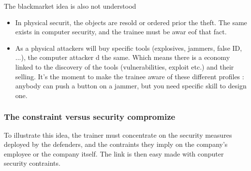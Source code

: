 \documentclass[11pt]{article} %
\begin{document}
The blackmarket idea is also not understood
\begin{itemize}
\item In physical securit, the objects are resold or ordered prior the theft. The 
same exists in computer security, and the trainee must be awar eof that fact. 
\item As a physical attackers will buy specific tools (explosives, jammers, 
false ID, ...), the computer attacker d the same. Which means there is a economy 
linked to the discovery of the tools (vulnerabilities, exploit etc.) and their selling. 
It's the moment to make the trainee aware of these different profiles : anybody can 
push a button on a jammer, but you need specific skill to design one.
\end{itemize}

\subsubsection{The constraint versus security compromize}
To illustrate this idea, the trainer must concentrate on the security measures 
deployed by the defenders, and the contraints they imply on the company's 
employee or the company itself. The link is then easy made with conputer 
security contraints.
\end{document}
